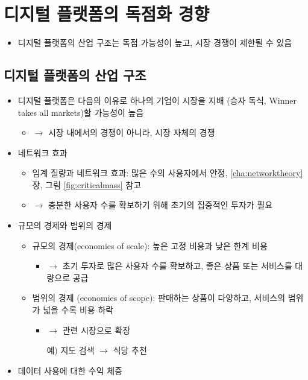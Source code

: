 \section{디지털 플랫폼의 독점화 경향}
\begin{itemize}
\item 디지털 플랫폼의 산업 구조는 독점 가능성이 높고, 시장 경쟁이 제한될 수 있음
\end{itemize}

\subsection{디지털 플랫폼의 산업 구조}
\begin{itemize}
\item 디지털 플랫폼은 다음의 이유로 하나의 기업이 시장을 지배 (승자 독식, Winner takes all markets)할 가능성이 높음 \citep{Zingales:2019aa, Furman:2019wl, OECD:2018wd}
	\begin{itemize}
	\item $\rightarrow$ 시장 내에서의 경쟁이 아니라, 시장 자체의 경쟁
	\end{itemize}	
\item 네트워크 효과
	\begin{itemize}
	\item 임계 질량과 네트워크 효과: 많은 수의 사용자에서 안정, \ref{cha:networktheory}장, 그림 \ref{fig:criticalmass} 참고
	\item $\rightarrow$ 충분한 사용자 수를 확보하기 위해 초기의 집중적인 투자가 필요
	\end{itemize}
\item 규모의 경제와 범위의 경제	
	\begin{itemize}	
	\item 규모의 경제(economies of scale): 높은 고정 비용과 낮은 한계 비용
		\begin{itemize}
		\item $\rightarrow$ 초기 투자로 많은 사용자 수를 확보하고, 좋은 상품 또는 서비스를 대량으로 공급
		\end{itemize}
	\item 범위의 경제 (economies of scope): 판매하는 상품이 다양하고, 서비스의 범위가 넓을 수록 비용 하락
		\begin{itemize}
		\item $\rightarrow$ 관련 시장으로 확장
		\item[예)] 지도 검색 $\rightarrow$ 식당 추천 
		\end{itemize}
	\end{itemize}
\item 데이터 사용에 대한 수익 체증

\end{itemize}
